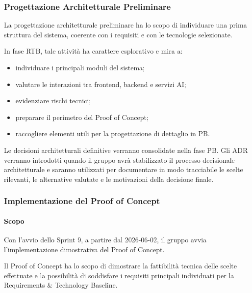 
\subsubsection{Progettazione Architetturale Preliminare}

La progettazione architetturale preliminare ha lo scopo di individuare una prima
struttura del sistema, coerente con i requisiti e con le tecnologie selezionate.

In fase RTB, tale attività ha carattere esplorativo e mira a:

\begin{itemize}
    \item individuare i principali moduli del sistema;
    \item valutare le interazioni tra frontend, backend e servizi AI;    \item evidenziare rischi tecnici;
    \item preparare il perimetro del Proof of Concept;
    \item raccogliere elementi utili per la progettazione di dettaglio in PB.
\end{itemize}

Le decisioni architetturali definitive verranno consolidate nella fase PB. Gli ADR
verranno introdotti quando il gruppo avrà stabilizzato il processo decisionale
architetturale e saranno utilizzati per documentare in modo tracciabile le scelte
rilevanti, le alternative valutate e le motivazioni della decisione finale.


\subsubsection{Implementazione del Proof of Concept}

\paragraph{Scopo}

Con l'avvio dello Sprint 9, a partire dal 2026-06-02, il gruppo avvia
l'implementazione dimostrativa del Proof of Concept.

Il Proof of Concept ha lo scopo di dimostrare la fattibilità tecnica delle scelte
effettuate e la possibilità di soddisfare i requisiti principali individuati per
la Requirements \& Technology Baseline.

